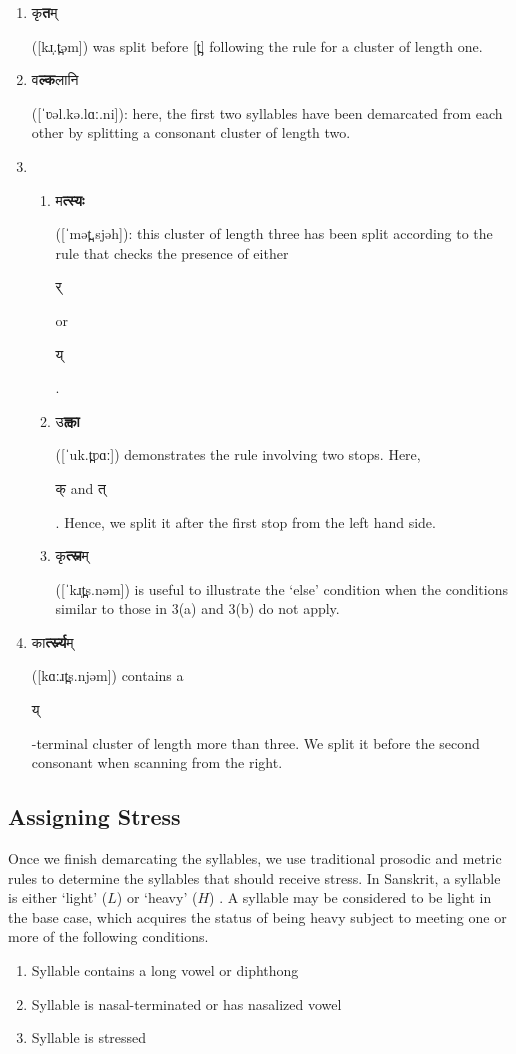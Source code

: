 \documentclass[10pt,a4paper]{article}
\newcommand{\sansk}[1]{\begin{sanskrit}#1\end{sanskrit}}
\begin{document}
\begin{enumerate}
	\item \sansk{कृ\textbf{त}म्} ([kɹ̩.t̪əm]) was split before [t̪] following the rule for a cluster of length one.
	
	\item\sansk{व\textbf{ल्क}लानि} ([ˈʋəl.kə.lɑː.ni]): here, the first two syllables have been demarcated from each other by splitting a consonant cluster of length two.
	
	\item 
	\begin{enumerate}
		\item \sansk{म\textbf{त्स्यः}} ([ˈmət̪.sjəh]): this cluster of length three has been split according to the rule that checks the presence of either \sansk{र्} or \sansk{य्}.
		
		\item
		\sansk{उ\textbf{क्त्वा}} ([ˈuk.t̪ʋɑː]) demonstrates the rule involving two stops. Here, \sansk{क् and त्}. Hence, we split it after the first stop from the left hand side.
		
		\item
		\sansk{कृ\textbf{त्स्न}म्} ([ˈkɹ̩t̪s.nəm]) is useful to illustrate the `else' condition when the conditions similar to those in 3(a) and 3(b) do not apply.
	\end{enumerate}
	
	\item
		
		\sansk{का\textbf{र्त्स्न्य}म्} ([kɑːɹt̪s.njəm]) contains a \sansk{य्}-terminal cluster of length more than three. We split it before the second consonant when scanning from the right.
		
	
\end{enumerate}

\subsection{Assigning Stress}
Once we finish demarcating the syllables, we use traditional prosodic and metric rules to determine the syllables that should receive stress. In Sanskrit, a syllable is either `light' ($L$) or `heavy' ($H$) \cite{sridharan2005sanskrit}. A syllable may be considered to be light in the base case, which acquires the status of being heavy subject to meeting one or more of the following conditions.
\begin{enumerate}
	\item Syllable contains a long vowel or diphthong
	\item Syllable is nasal-terminated or has nasalized vowel
	\item Syllable is stressed
\end{enumerate}
\end{document}
